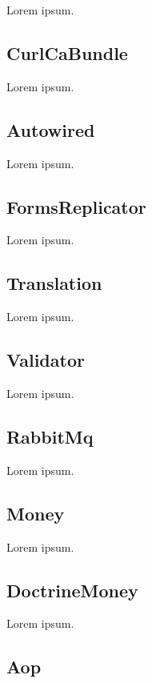 Lorem ipsum.

\subsection{CurlCaBundle} \label{sec:state:curl-ca-bundle}

Lorem ipsum.

\subsection{Autowired} \label{sec:state:autowired}

Lorem ipsum.

\subsection{FormsReplicator} \label{sec:state:forms-replicator}

Lorem ipsum.

\subsection{Translation} \label{sec:state:translation}

Lorem ipsum.

\subsection{Validator} \label{sec:state:validator}

Lorem ipsum.

\subsection{RabbitMq} \label{sec:state:rabbit-mq}

Lorem ipsum.

\subsection{Money} \label{sec:state:money}

Lorem ipsum.

\subsection{DoctrineMoney} \label{sec:state:doctrine-money}

Lorem ipsum.

\subsection{Aop} \label{sec:state:aop}

